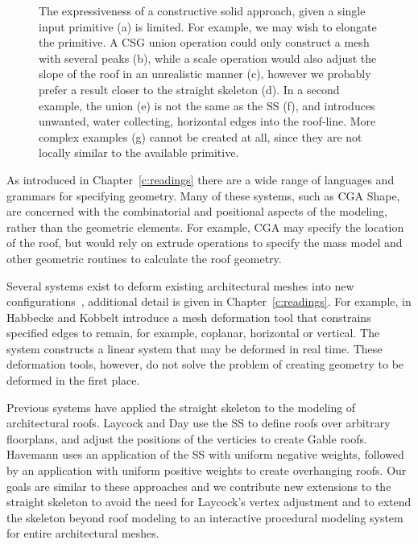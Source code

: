 \begin{figure}
  \centering
  \def\svgwidth{1.0\columnwidth}
  
  \caption[CSG failure cases]{\label{fig:csg}The expressiveness of a constructive solid approach, given a single input primitive (a) is limited. For example, we may wish to elongate the primitive. A CSG union operation could only construct a mesh with several peaks (b), while a scale operation would also adjust the slope of the roof in an unrealistic manner (c), however we probably prefer a result closer to the straight skeleton (d). In a second example, the union (e) is not the same as the SS (f), and introduces unwanted, water collecting, horizontal edges into the roof-line. More complex examples (g) cannot be created at all, since they are not locally similar to the available primitive.}
\end{figure}

\FloatBarrier

As introduced in Chapter~\ref{c:readings} there are a wide range of languages and grammars for specifying geometry. Many of these systems, such as CGA Shape\cite{Pascal06}, are concerned with the combinatorial and positional aspects of the modeling, rather than the geometric elements. For example, CGA may specify the location of the roof, but would rely on extrude operations to specify the mass model and other geometric routines to calculate the roof geometry.


Several systems exist to deform existing architectural meshes into new configurations~\cite{Habbecke12, Cabral09, Gal09}, additional detail is given in Chapter~\ref{c:readings}. For example, in \cite{Habbecke12} Habbecke and Kobbelt introduce a mesh deformation tool that constrains specified edges to remain, for example, coplanar, horizontal or vertical. The system constructs a linear system that may be deformed in real time. These deformation tools, however, do not solve the problem of creating geometry to be deformed in the first place.

Previous systems have applied the straight skeleton to the modeling of architectural roofs. Laycock and Day\cite{Laycock03} use the SS to define roofs over arbitrary floorplans, and adjust the positions of the verticies to create Gable roofs. Havemann\cite{Havemann:2005:GMM} uses an application of the SS with uniform negative weights, followed by an application with uniform positive weights to create overhanging roofs. Our goals are similar to these approaches and we contribute new extensions to the straight skeleton to avoid the need for Laycock's vertex adjustment and to extend the skeleton beyond roof modeling to an interactive procedural modeling system for entire architectural meshes.



